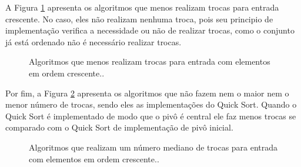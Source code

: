 \documentclass[conference,onecolumn]{IEEEtran}
\begin{document}
A Figura \ref{graf:trocas-crescente-menos} apresenta os algoritmos que menos realizam trocas para entrada crescente. No caso, eles não realizam nenhuma troca, pois seu principio de implementação verifica a necessidade ou não de realizar trocas, como o conjunto já está ordenado não é necessário realizar trocas.

\begin{figure}[H]
\begin{center}
\end{center}
\caption{Algoritmos que menos realizam trocas para entrada com elementos em ordem crescente..}
\label{graf:trocas-crescente-menos}
\end{figure}

Por fim, a Figura \ref{graf:trocas-crescente-mediano} apresenta os algoritmos que não fazem nem o maior nem o menor número de trocas, sendo eles as implementações do Quick Sort. Quando o Quick Sort é implementado de modo que o pivô é central ele faz menos trocas se comparado com o Quick Sort de implementação de pivô inicial.

\begin{figure}[H]
\begin{center}
\end{center}
\caption{Algoritmos que realizam um número mediano de trocas para entrada com elementos em ordem crescente..}
\label{graf:trocas-crescente-mediano}
\end{figure}
\end{document}
